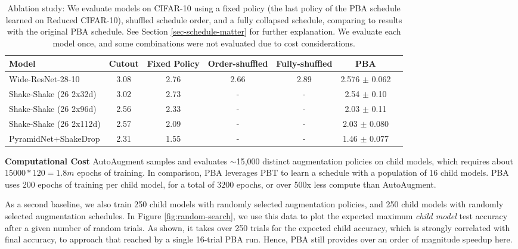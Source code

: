 \documentclass{article}
\begin{document}
\begin{table*}[ht]
\caption{Ablation study: We evaluate models on CIFAR-10 using a fixed policy (the last policy of the PBA schedule learned on Reduced CIFAR-10), shuffled schedule order, and a fully collapsed schedule, comparing to results with the original PBA schedule. See Section \ref{sec-schedule-matter} for further explanation. We evaluate each model once, and some combinations were not evaluated due to cost considerations.}
\label{table-cifar10-ablation-fixed}
\vskip 0.15in
\begin{center}
\begin{small}
\begin{tabular}{lcccccc}
\toprule
Model & Cutout & Fixed Policy & Order-shuffled & Fully-shuffled & PBA \\
\midrule
Wide-ResNet-28-10     & 3.08 &  2.76  & 2.66 & 2.89 &  2.576 $\pm$ 0.062  \\
Shake-Shake (26 2x32d) & 3.02 &2.73 & -&- & 2.54 $\pm$ 0.10  \\
Shake-Shake (26 2x96d) & 2.56 & 2.33 &- &- & 2.03 $\pm$ 0.11 \\
Shake-Shake (26 2x112d) & 2.57 &2.09 &- &- & 2.03  $\pm$ 0.080  \\
PyramidNet+ShakeDrop   & 2.31 & 1.55 & - &- & 1.46  $\pm$ 0.077 \\
\bottomrule
\end{tabular}
\end{small}
\end{center}
\vskip -0.1in
\label{table:ablate_schedule}
\end{table*} 
\textbf{Computational Cost} AutoAugment samples and evaluates $\sim$15,000 distinct augmentation policies on child models, which requires about $15000 * 120 = 1.8m$ epochs of training. In comparison, PBA leverages PBT to learn a schedule with a population of 16 child models. PBA uses 200 epochs of training per child model, for a total of $3200$ epochs, or over 500x less compute than AutoAugment.

As a second baseline, we also train 250 child models with randomly selected augmentation policies, and 250 child models with randomly selected augmentation schedules. In Figure \ref{fig:random-search}, we use this data to plot the expected maximum \textit{child model} test accuracy after a given number of random trials. As shown, it takes over 250 trials for the expected child accuracy, which is strongly correlated with final accuracy, to approach that reached by a single 16-trial PBA run. Hence, PBA still provides over an order of magnitude speedup here.
\end{document}
